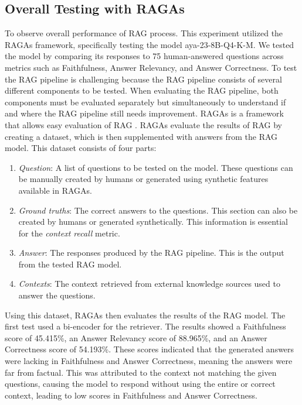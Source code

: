 \subsection{Overall Testing with RAGAs}

To observe overall performance of RAG process. This experiment utilized the RAGAs framework, specifically testing the model aya-23-8B-Q4-K-M. We tested the model by comparing its responses to 75 human-answered questions across metrics such as Faithfulness, Answer Relevancy, and Answer Correctness.
To test the RAG pipeline is challenging because the RAG pipeline consists of several different components to be tested. When evaluating the RAG pipeline, both components must be evaluated separately but simultaneously to understand if and where the RAG pipeline still needs improvement. RAGAs is a framework that allows easy evaluation of RAG \cite{es2023ragas}. RAGAs evaluate the results of RAG by creating a dataset, which is then supplemented with answers from the RAG model. This dataset consists of four parts:

\begin{enumerate}[nolistsep]
\item \emph{Question}: A list of questions to be tested on the model. These questions can be manually created by humans or generated using synthetic features available in RAGAs.
\item \emph{Ground truths}: The correct answers to the questions. This section can also be created by humans or generated synthetically. This information is essential for the \emph{context recall} metric.
\item \emph{Answer}: The responses produced by the RAG pipeline. This is the output from the tested RAG model.
\item \emph{Contexts}: The context retrieved from external knowledge sources used to answer the questions.
\end{enumerate}

Using this dataset, RAGAs then evaluates the results of the RAG model.
The first test used a bi-encoder for the retriever. The results showed a Faithfulness score of 45.415\%, an Answer Relevancy score of 88.965\%, and an Answer Correctness score of 54.193\%. These scores indicated that the generated answers were lacking in Faithfulness and Answer Correctness, meaning the answers were far from factual. This was attributed to the context not matching the given questions, causing the model to respond without using the entire or correct context, leading to low scores in Faithfulness and Answer Correctness.

